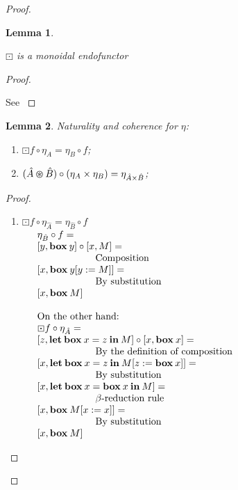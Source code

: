\documentclass[a4paper]{article}
\newtheorem{lemma}{Lemma}
\begin{document}
\begin{proof}
\begin{lemma}
  $ $

  $\boxdot$ is a monoidal endofunctor
\end{lemma}

\begin{proof}
$ $

See \cite{ModalK}
\end{proof}

\begin{lemma} Naturality and coherence for $\eta$:

\begin{enumerate}
  \item $\boxdot f \circ \eta_A = \eta_B \circ f$;
  \item $(\hat{A} \varoast \hat{B}) \circ (\eta_{A} \times \eta_{B}) = \eta_{\hat{A} \times \hat{B}}$;
\end{enumerate}
\end{lemma}

\begin{proof}
  $ $

\begin{enumerate}
\item $\boxdot f \circ \eta_{\hat{A}} = \eta_{\hat{B}} \circ f$ \\

$\begin{array}{lll}
&\eta_{\hat{B}} \circ f = & \\
&[y, {\bf box \:} y] \circ [x, M] = &\\
&\quad\quad\quad\quad\quad\quad \text{Composition} & \\
&[x, {\bf box \:} y [y := M]] = &\\
&\quad\quad\quad\quad\quad\quad \text{By substitution}& \\
&[x, {\bf box \:} M]& \\
& &\\
&\text{On the other hand:}& \\
&\boxdot f \circ \eta_{\hat{A}} = & \\
&[z, {\bf let \: box \:} x = z {\: \bf in \:} M] \circ [x, {\bf box \:} x] = &\\
&\quad\quad\quad\quad\quad\quad \text{By the definition of composition}& \\
&[x, {\bf let \: box \:} x = z {\: \bf in \:} M [z := {\bf box \:} x]] = & \\
&\quad\quad\quad\quad\quad\quad \text{By substitution}& \\
&[x, {\bf let \: box \:} x = {\bf box \:} x {\: \bf in \:} M] = & \\
&\quad\quad\quad\quad\quad\quad \text{$\beta$-reduction rule}& \\
&[x, {\bf box \:} M [x := x]] = &\\
&\quad\quad\quad\quad\quad\quad \text{By substitution} & \\
&[x, {\bf box \:} M]&
\end{array}$


\end{enumerate}
\end{proof}
\end{proof}
\end{document}
